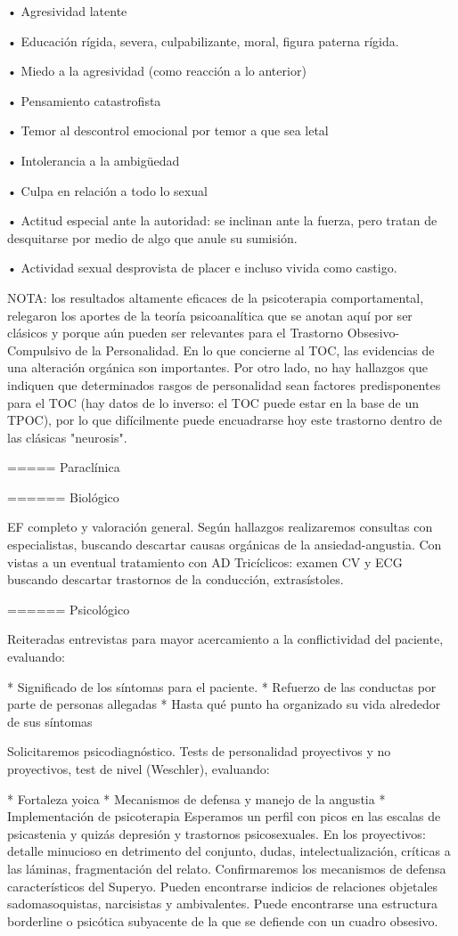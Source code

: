 \documentclass[encares.tex]{subfiles}
\begin{document}
• Agresividad latente

• Educación rígida, severa, culpabilizante, moral, figura paterna rígida.

• Miedo a la agresividad (como reacción a lo anterior)

• Pensamiento catastrofista

• Temor al descontrol emocional por temor a que sea letal

• Intolerancia a la ambigüedad

• Culpa en relación a todo lo sexual

• Actitud especial ante la autoridad: se inclinan ante la fuerza, pero tratan de desquitarse por medio de algo que anule su sumisión.

• Actividad sexual desprovista de placer e incluso vivida como castigo.

NOTA: los resultados altamente eficaces de la psicoterapia comportamental, relegaron los aportes de la teoría psicoanalítica que se anotan aquí por ser clásicos y porque aún pueden ser relevantes para el Trastorno Obsesivo-Compulsivo de la Personalidad. En lo que concierne al TOC, las evidencias de una alteración orgánica son importantes. Por otro lado, no hay hallazgos que indiquen que determinados rasgos de personalidad sean factores predisponentes para el TOC (hay datos de lo inverso: el TOC puede estar en la base de un TPOC), por lo que difícilmente puede encuadrarse hoy este trastorno dentro de las clásicas "neurosis".

===== Paraclínica

====== Biológico

EF completo y valoración general. Según hallazgos realizaremos consultas con especialistas, buscando descartar causas orgánicas de la ansiedad-angustia. Con vistas a un eventual tratamiento con AD Tricíclicos: examen CV y ECG buscando descartar trastornos de la conducción, extrasístoles.

====== Psicológico

Reiteradas entrevistas para mayor acercamiento a la conflictividad del paciente, evaluando:

* Significado de los síntomas para el paciente.
* Refuerzo de las conductas por parte de personas allegadas
* Hasta qué punto ha organizado su vida alrededor de sus síntomas

Solicitaremos psicodiagnóstico. Tests de personalidad proyectivos y no proyectivos, test de nivel (Weschler), evaluando:

* Fortaleza yoica
* Mecanismos de defensa y manejo de la angustia
* Implementación de psicoterapia Esperamos un perfil con picos en las escalas de psicastenia y quizás depresión y trastornos psicosexuales. En los proyectivos: detalle minucioso en detrimento del conjunto, dudas, intelectualización, críticas a las láminas, fragmentación del relato. Confirmaremos los mecanismos de defensa característicos del Superyo. Pueden encontrarse indicios de relaciones objetales sadomasoquistas, narcisistas y ambivalentes. Puede encontrarse una estructura borderline o psicótica subyacente de la que se defiende con un cuadro obsesivo.
\end{document}
